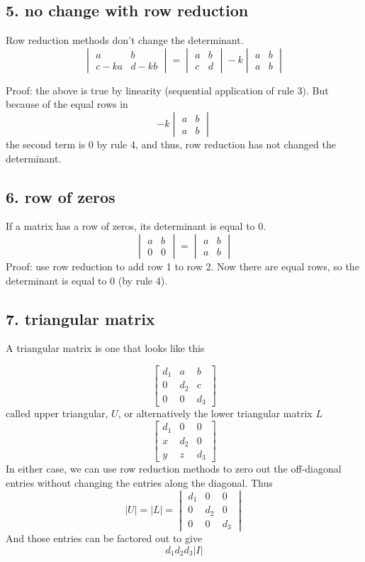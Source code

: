 \documentclass[11pt, oneside]{article}
\begin{document}
\subsection*{5. no change with row reduction}
Row reduction methods don't change the determinant.
\[
\begin{vmatrix} a  &  b \\ c - ka &  d - kb \end{vmatrix}
=
\begin{vmatrix} a  &  b \\ c  &  d \end{vmatrix}
-
k
\begin{vmatrix} a  &  b \\ a  &  b \end{vmatrix}
\]

Proof:  the above is true by linearity (sequential application of rule 3).  But because of the equal rows in 
\[
-k
\begin{vmatrix} a  &  b \\ a  &  b \end{vmatrix}
\]
the second term is $0$ by rule 4, and thus, row reduction has not changed the determinant.

\subsection*{6. row of zeros}
If a matrix has a row of zeros, its determinant is equal to 0.
\[
\begin{vmatrix} a  &  b \\ 0 &  0 \end{vmatrix}
=
\begin{vmatrix} a  &  b \\ a  &  b \end{vmatrix}
\]
Proof:  use row reduction to add row 1 to row 2.  Now there are equal rows, so the determinant is equal to 0 (by rule 4).
\subsection*{7. triangular matrix}
A triangular matrix is one that looks like this

\[
\begin{bmatrix} 
d_1  &  a & b \\ 
0  &  d_2 & c \\ 
0 & 0  &  d_3
 \end{bmatrix}
 \]
called upper triangular, $U$, or alternatively the lower triangular matrix $L$
\[
\begin{bmatrix} 
d_1  &  0 & 0 \\ 
x  &  d_2 & 0 \\ 
y & z  &  d_3 
\end{bmatrix}
\]
In either case, we can use row reduction methods to zero out the off-diagonal entries without changing the entries along the diagonal.  Thus
\[
|U| = |L| = 
\begin{vmatrix} 
d_1  &  0 & 0 \\ 
0  &  d_2 & 0 \\ 
0 & 0  &  d_3 
\end{vmatrix}
\]
And those entries can be factored out to give
\[ d_1 d_2 d_3 |I |\]
\end{document}
